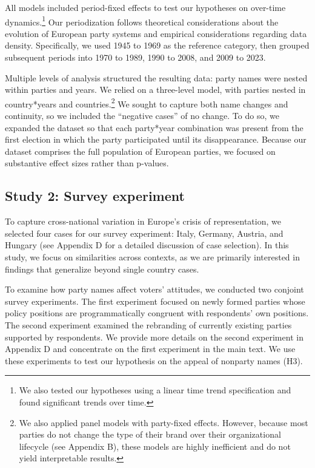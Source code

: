 \documentclass[12pt]{article}
\begin{document}
All models included period-fixed effects to test our hypotheses on over-time dynamics.\footnote{We also tested our hypotheses using a linear time trend specification and found significant trends over time.} Our periodization follows theoretical considerations about the evolution of European party systems and empirical considerations regarding data density. Specifically, we used 1945 to 1969 as the reference category, then grouped subsequent periods into 1970 to 1989, 1990 to 2008, and 2009 to 2023.

Multiple levels of analysis structured the resulting data: party names were nested within parties and years. We relied on a three-level model, with parties nested in country*years and countries.\footnote{We also applied panel models with party-fixed effects. However, because most parties do not change the type of their brand over their organizational lifecycle (see Appendix B), these models are highly inefficient and do not yield interpretable results.} We sought to capture both name changes and continuity, so we included the ``negative cases'' of no change. To do so, we expanded the dataset so that each party*year combination was present from the first election in which the party participated until its disappearance. Because our dataset comprises the full population of European parties, we focused on substantive effect sizes rather than p-values.

\subsection{Study 2: Survey experiment}

To capture cross-national variation in Europe's crisis of representation, we selected four cases for our survey experiment: Italy, Germany, Austria, and Hungary (see Appendix D for a detailed discussion of case selection). In this study, we focus on similarities across contexts, as we are primarily interested in findings that generalize beyond single country cases.

To examine how party names affect voters' attitudes, we conducted two conjoint survey experiments. The first experiment focused on newly formed parties whose policy positions are programmatically congruent with respondents' own positions.  The second experiment examined the rebranding of currently existing parties supported by respondents. We provide more details on the second experiment in Appendix D and concentrate on the first experiment in the main text. We use these experiments to test our hypothesis on the appeal of nonparty names (H3).
\end{document}
